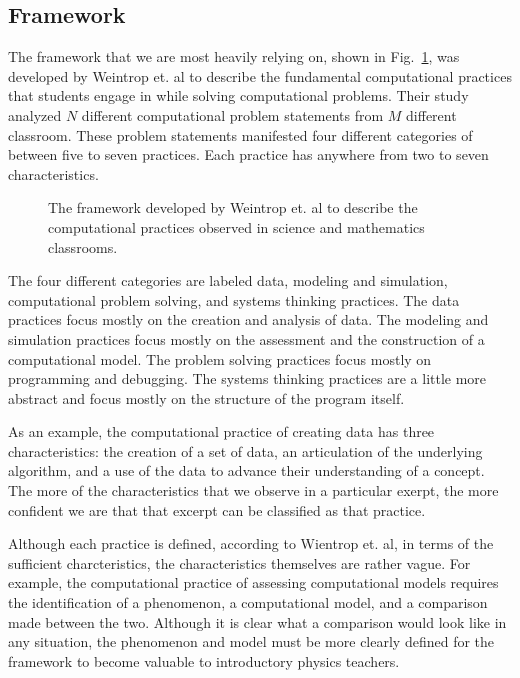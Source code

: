 \documentclass{msuphddissertation}
\begin{document}
\begin{doublespace}
\section{Framework}

The framework that we are most heavily relying on, shown in Fig.~\ref{CH2:Framework}, was developed by Weintrop et. al to describe the fundamental computational practices that students engage in while solving computational problems.  Their study analyzed $N$ different computational problem statements from $M$ different classroom.  These problem statements manifested four different categories of between five to seven practices.  Each practice has anywhere from two to seven characteristics.

\begin{figure}
\caption{The framework developed by Weintrop et. al to describe the computational practices observed in science and mathematics classrooms.}\label{CH2:Framework}
\end{figure}

The four different categories are labeled data, modeling and simulation, computational problem solving, and systems thinking practices.  The data practices focus mostly on the creation and analysis of data.  The modeling and simulation practices focus mostly on the assessment and the construction of a computational model.  The problem solving practices focus mostly on programming and debugging.  The systems thinking practices are a little more abstract and focus mostly on the structure of the program itself.

As an example, the computational practice of creating data has three characteristics: the creation of a set of data, an articulation of the underlying algorithm, and a use of the data to advance their understanding of a concept.  The more of the characteristics that we observe in a particular exerpt, the more confident we are that that excerpt can be classified as that practice.

Although each practice is defined, according to Wientrop et. al, in terms of the sufficient charcteristics, the characteristics themselves are rather vague.  For example, the computational practice of assessing computational models requires the identification of a phenomenon, a computational model, and a comparison made between the two.  Although it is clear what a comparison would look like in any situation, the phenomenon and model must be more clearly defined for the framework to become valuable to introductory physics teachers.


\end{doublespace}
\end{document}
